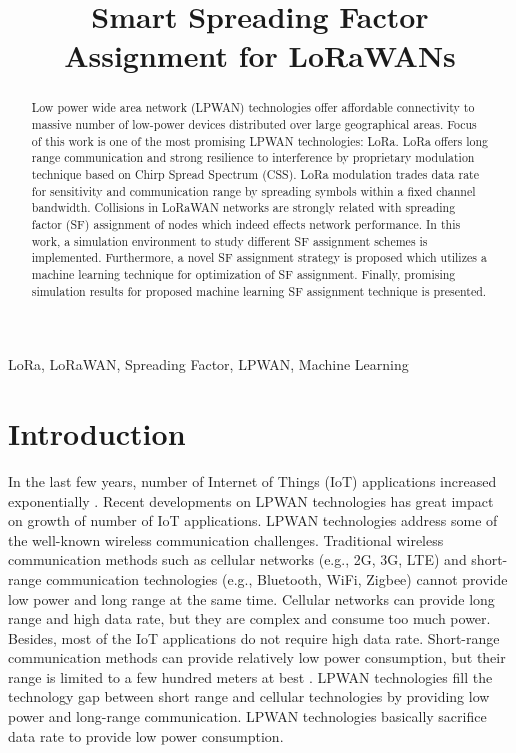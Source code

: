 \documentclass[conference]{IEEEtran}
\begin{document}
\title{Smart Spreading Factor Assignment for LoRaWANs}


\author{
}
\maketitle


\begin{abstract}
Low power wide area network (LPWAN) technologies offer affordable connectivity to massive number of low-power devices distributed over large geographical areas. Focus of this work is one of the most promising LPWAN technologies: LoRa. LoRa offers long range communication and strong resilience to interference by proprietary modulation technique based on Chirp Spread Spectrum (CSS). LoRa modulation trades data rate for sensitivity and communication range by spreading symbols within a fixed channel bandwidth. Collisions in LoRaWAN networks are strongly related with spreading factor (SF) assignment of nodes which indeed effects network performance. In this work, a simulation environment to study different SF assignment schemes is implemented. Furthermore, a novel SF assignment strategy is proposed which utilizes a machine learning technique for optimization of SF assignment. Finally, promising simulation results for proposed machine learning SF assignment technique is presented.
\end{abstract}


\begin{IEEEkeywords}
LoRa, LoRaWAN, Spreading Factor, LPWAN, Machine Learning
\end{IEEEkeywords}


\section{Introduction}
\par In the last few years, number of Internet of Things (IoT) applications increased exponentially \cite{7721743}. Recent developments on LPWAN technologies has great impact on growth of number of IoT applications. LPWAN technologies address some of the well-known wireless communication challenges. Traditional wireless communication methods such as cellular networks (e.g., 2G, 3G, LTE) and short-range communication technologies (e.g., Bluetooth, WiFi, Zigbee) cannot provide low power and long range at the same time. Cellular networks can provide long range and high data rate, but they are complex and consume too much power. Besides, most of the IoT applications do not require high data rate. Short-range communication methods can provide relatively low power consumption, but their range is limited to a few hundred meters at best \cite{7815384}. LPWAN technologies fill the technology gap between short range and cellular technologies by providing low power and long-range communication. LPWAN technologies basically sacrifice data rate to provide low power consumption.
\end{document}

